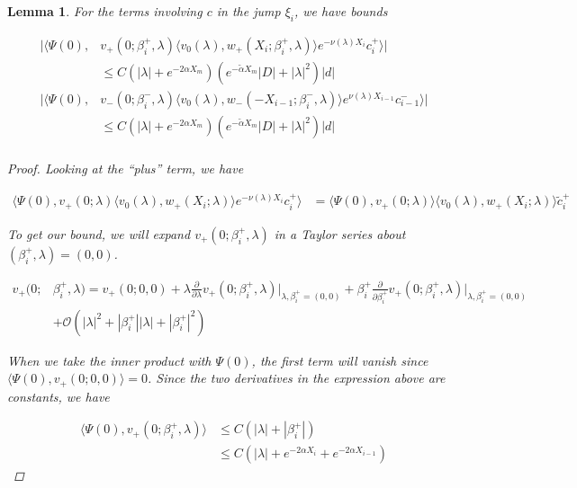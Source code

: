 \documentclass[12pt]{article}
\newtheorem{lemma}{Lemma}
\begin{document}
\begin{lemma}\label{jumpc}
For the terms involving $c$ in the jump $\xi_i$, we have bounds

\begin{align*}
|\langle \Psi(0), &v_+(0; \beta_i^+, \lambda) \langle v_0(\lambda), w_+(X_i; \beta_i^+,\lambda) \rangle e^{-\nu(\lambda)X_i} c_i^+ \rangle| \\
&\leq C ( |\lambda| + e^{-2 \alpha X_m} )( e^{-\tilde{\alpha} X_m} |D| + |\lambda|^2 )|d|  \\
|\langle \Psi(0), &v_-(0; \beta_i^-, \lambda) \langle v_0(\lambda), w_-(-X_{i-1}; \beta_i^-, \lambda) \rangle e^{\nu(\lambda)X_{i-1}} c_{i-1}^- \rangle | \\
&\leq C ( |\lambda| + e^{-2 \alpha X_m} )( e^{-\tilde{\alpha} X_m} |D| + |\lambda|^2 )|d|  \\
\end{align*}

\begin{proof}
Looking at the ``plus'' term, we have

\begin{align*}
\langle \Psi(0), v_+(0; \lambda) \langle v_0(\lambda), w_+(X_i; \lambda) \rangle e^{-\nu(\lambda)X_i} c_i^+ \rangle &= \langle \Psi(0), v_+(0; \lambda) \rangle \langle v_0(\lambda), w_+(X_i; \lambda) \rangle \tilde{c}_i^+
\end{align*}

To get our bound, we will expand $v_+(0; \beta_i^+, \lambda)$ in a Taylor series about $(\beta_i^+, \lambda) = (0, 0)$.

\begin{align*}
v_+(0; &\beta_i^+, \lambda) = v_+(0; 0, 0) 
+ \lambda \frac{\partial}{\partial \lambda}v_+(0; \beta_i^+, \lambda)\Big|_{\lambda, \beta_i^+ = (0, 0)} 
+ \beta_i^+ \frac{\partial}{\partial \beta_i^+}v_+(0; \beta_i^+, \lambda)\Big|_{\lambda, \beta_i^+ = (0, 0)} \\
&+ \mathcal{O}(|\lambda|^2 + |\beta_i^+||\lambda| + |\beta_i^+|^2)
\end{align*}

When we take the inner product with $\Psi(0)$, the first term will vanish since 
$\langle \Psi(0), v_+(0; 0, 0) \rangle = 0$. Since the two derivatives in the expression above are constants, we have

\begin{align*}
\langle \Psi(0), v_+(0; \beta_i^+, \lambda) \rangle &\leq C ( |\lambda| + |\beta_i^+| ) \\
&\leq C ( |\lambda| + e^{-2 \alpha X_i} + e^{-2 \alpha X_{i-1}} )
\end{align*}


\end{proof}
\end{lemma}
\end{document}
